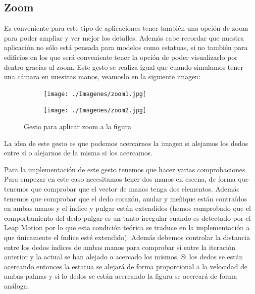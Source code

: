 \documentclass[a4paper,11pt]{article}
\begin{document}
\subsection{Zoom}

Es conveniente para este tipo de aplicaciones tener también una opción de zoom para poder ampliar y ver mejor los detalles. Además cabe recordar que nuestra aplicación no sólo está pensada para modelos como estatuas, si no también para edificios en los que será conveniente tener la opción de poder visualizarlo por dentro gracias al zoom. Este gesto se realiza igual que cuando simulamos tener una cámara en nuestras manos, veamoslo en la siguiente imagen:

\begin{figure}[!h]
	\centering
	\begin{subfigure}{0.48\textwidth}
		\centering
		\texttt{[image: ./Imagenes/zoom1.jpg]}
	\end{subfigure}
	\begin{subfigure}{0.48\textwidth}
		\centering
		\texttt{[image: ./Imagenes/zoom2.jpg]}
	\end{subfigure}
	\caption{Gesto para aplicar zoom a la figura}
	\label{gesto4}
\end{figure}

La idea de este gesto es que podemos acercarnos la imagen si alejamos los dedos entre sí o alejarnos de la misma si los acercamos.

\vspace{10px}

Para la implementación de este gesto tenemos que hacer varias comprobaciones. Para empezar en este caso necesitamos tener dos manos en escena, de forma que tenemos que comprobar que el vector de manos tenga dos elementos. Además tenemos que comprobar que el dedo corazón, anular y meñique están contraídos en ambas manos y el índice y pulgar están extendidos (hemos comprobado que el comportamiento del dedo pulgar es un tanto irregular cuando es detectado por el Leap Motion por lo que esta condición teórica se traduce en la implementación a que únicamente el índice esté extendido). Además debemos controlar la distancia entre los dedos índices de ambas manos para comprobar si entre la iteración anterior y la actual se han alejado o acercado los mismos. Si los dedos se están acercando entonces la estatua se alejará de forma proporcional a la velocidad de ambas palmas y si lo dedos se están acercando la figura se acercará de forma análoga.
\end{document}
